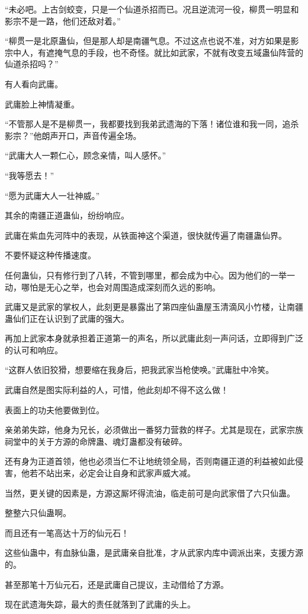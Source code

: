 \begin{this_body}
“未必吧。上古剑蛟变，只是一个仙道杀招而已。况且逆流河一役，柳贯一明显和影宗不是一路，他们还敌对着。”

“柳贯一是北原蛊仙，但是那人却是南疆气息。不过这点也说不准，对方如果是影宗中人，有遮掩气息的手段，也不奇怪。就比如武家，不就有改变五域蛊仙阵营的仙道杀招吗？”

有人看向武庸。

武庸脸上神情凝重。

“不管那人是不是柳贯一，我都要找到我弟武遗海的下落！诸位谁和我一同，追杀影宗？”他朗声开口，声音传遍全场。

“武庸大人一颗仁心，顾念亲情，叫人感怀。”

“我等愿去！”

“愿为武庸大人一壮神威。”

其余的南疆正道蛊仙，纷纷响应。

武庸在紫血先河阵中的表现，从铁面神这个渠道，很快就传遍了南疆蛊仙界。

不要怀疑这种传播速度。

任何蛊仙，只有修行到了八转，不管到哪里，都会成为中心。因为他们的一举一动，哪怕是无心之举，也会对周围造成深刻而久远的影响。

武庸又是武家的掌权人，此刻更是暴露出了第四座仙蛊屋玉清滴风小竹楼，让南疆蛊仙们正在认识到了武庸的强大。

再加上武家本身就承担着正道第一的声名，所以武庸此刻一声问话，立即得到广泛的认可和响应。

“这群人依旧狡猾，想要缩在我身后，把我武家当枪使唤。”武庸肚中冷笑。

武庸自然是图实际利益的人，可惜，他此刻却不得不这么做！

表面上的功夫他要做到位。

亲弟弟失踪，他身为兄长，必须做出一番努力营救的样子。尤其是现在，武家宗族祠堂中的关于方源的命牌蛊、魂灯蛊都没有破碎。

还有身为正道首领，他也必须当仁不让地统领全局，否则南疆正道的利益被如此侵害，他若不站出来，必定会让自身和武家声威大减。

当然，更关键的因素是，方源这厮坏得流油，临走前可是向武家借了六只仙蛊。

整整六只仙蛊啊。

而且还有一笔高达十万的仙元石！

这些仙蛊中，有血脉仙蛊，是武庸亲自批准，才从武家内库中调派出来，支援方源的。

甚至那笔十万仙元石，还是武庸自己提议，主动借给了方源。

现在武遗海失踪，最大的责任就落到了武庸的头上。


\end{this_body}
